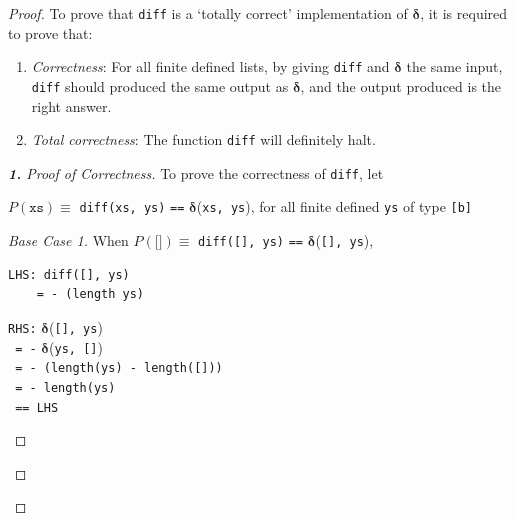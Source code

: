 \documentclass[12pt]{article}
\newcommand{\haskell}{\texttt}
\begin{document}
\begin{proof}
To prove that \haskell{diff} is a `totally correct' implementation of $\bm{\delta}$, it is required to prove that:
\begin{enumerate}
    \item \emph{Correctness}: For all finite defined lists, by giving \haskell{diff} and $\bm{\delta}$ the same input, \haskell{diff} should produced the same output as $\bm{\delta}$, and the output produced is the right answer.
    \item \emph{Total correctness}: The function \haskell{diff} will definitely halt.
\end{enumerate}

\begin{proof}[\textbf{1.} Proof of Correctness]
To prove the correctness of \haskell{diff}, let
\begin{center}
    $P(\haskell{xs}) \equiv$ \haskell{diff(xs, ys)} \haskell{==} $\bm{\delta}$(\haskell{xs, ys}), for all finite defined \haskell{ys} of type \haskell{[b]}
\end{center}

\begin{proof}[Base Case 1]
When $P(\haskell{[]}) \equiv$ \haskell{diff([], ys)} \haskell{==} $\bm{\delta}$(\haskell{[], ys}),
\begin{mdframed}
\begin{multicols}{2}
\begin{verbatim}
LHS: diff([], ys)
    = - (length ys)
\end{verbatim}
\columnbreak
\haskell{RHS:} $ \bm{\delta}$(\haskell{[], ys}) \\
\haskell{    = -} $\bm{\delta}$(\haskell{ys, []}) \\
\haskell{    = - (length(ys) - length([]))} \\
\haskell{    = - length(ys)} \\
\haskell{    == LHS}
\end{multicols}
\end{mdframed}
\end{proof}


\end{proof}
\end{proof}
\end{document}
